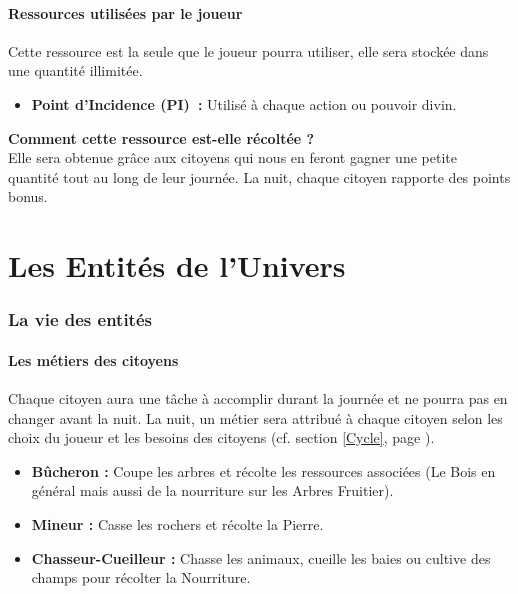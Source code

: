 \documentclass[a4paper]{article}
\newcommand{\alinea}{\hspace*{0.5cm}}
\begin{document}
      \subsection{Ressources utilisées par le joueur}
        \alinea Cette ressource est la seule que le joueur pourra utiliser, elle sera stockée dans une quantité illimitée.
        \begin{itemize} \small
          \item \textbf{Point d'Incidence (PI) :} Utilisé à chaque action ou pouvoir divin.
        \end{itemize} \normalsize
        \textbf{Comment cette ressource est-elle récoltée ? }\\
        \alinea Elle sera obtenue grâce aux citoyens qui nous en feront gagner une petite quantité tout au long de leur journée. La nuit, chaque citoyen rapporte des points bonus.


  \newpage
  \part{Les Entités de l'Univers}
    \section{La vie des entités}

      \subsection{Les métiers des citoyens}
        \label{Metier}
        \alinea Chaque citoyen aura une tâche à accomplir durant la journée et ne pourra pas en changer avant la nuit. La nuit, un métier sera attribué à chaque citoyen selon les choix du joueur et les besoins des citoyens (cf. section \ref{Cycle}, page \pageref{Cycle}).
        \begin{itemize} \small
          \item \textbf{Bûcheron :} Coupe les arbres et récolte les ressources associées (Le Bois en général mais aussi de la nourriture sur les Arbres Fruitier).
          \item \textbf{Mineur :} Casse les rochers et récolte la Pierre.
          \item \textbf{Chasseur-Cueilleur :} Chasse les animaux, cueille les baies ou cultive des champs pour récolter la Nourriture.
        \end{itemize} \normalsize
\end{document}
